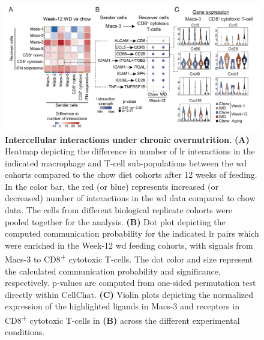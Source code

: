 \begin{figure}[t]
\centering
\includegraphics[width=\linewidth]{Chapter4/Fig/F2-7-01.png}
\caption[Intercellular interactions under chronic overnutrition]{\textbf{Intercellular interactions under chronic overnutrition.} \textbf{(A)} Heatmap depicting the difference in number of \gls{lr} interactions in the indicated macrophage and T-cell sub-populations between the \gls{wd} cohorts compared to the chow diet cohorts after 12 weeks of feeding. In the color bar, the red (or blue) represents increased (or decreased) number of interactions in the \gls{wd} data compared to chow data. The cells from different biological replicate cohorts were pooled together for the analysis. \textbf{(B)} Dot plot depicting the computed communication probability for the indicated \gls{lr} pairs which were enriched in the Week-12 \gls{wd} feeding cohorts, with signals from Macs-3 to CD8\textsuperscript{+} cytotoxic T-cells. The dot color and size represent the calculated communication probability and significance, respectively. p-values are computed from one-sided permutation test directly within CellChat. \textbf{(C)} Violin plots depicting the normalized expression of the highlighted ligands in Macs-3 and receptors in CD8\textsuperscript{+} cytotoxic T-cells in \textbf{(B)} across the different experimental conditions.}
\label{fig:chp2_scrna_cellchat2}
\end{figure}

